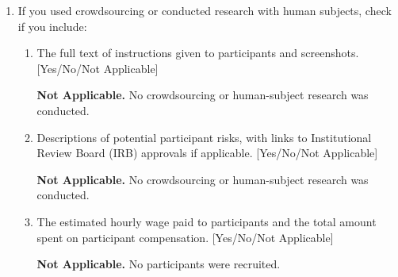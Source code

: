 \begin{enumerate}[leftmargin=*]
\begin{enumerate}
  \textbf{Not Applicable.} No assets are used or released.

  \item New assets either in the supplemental material or as a URL, if applicable. [Yes/No/Not Applicable]

  \textbf{Not Applicable.} No assets are released.

  \item Information about consent from data providers/curators. [Yes/No/Not Applicable]

  \textbf{Not Applicable.} No data are used.

  \item Discussion of sensible content if applicable, e.g., personally identifiable information or offensive content. [Yes/No/Not Applicable]

  \textbf{Not Applicable.} No data or human-generated content are used.
  \end{enumerate}

\item If you used crowdsourcing or conducted research with human subjects, check if you include:
  \begin{enumerate}
  \item The full text of instructions given to participants and screenshots. [Yes/No/Not Applicable]

  \textbf{Not Applicable.} No crowdsourcing or human-subject research was conducted.

  \item Descriptions of potential participant risks, with links to Institutional Review Board (IRB) approvals if applicable. [Yes/No/Not Applicable]

  \textbf{Not Applicable.} No crowdsourcing or human-subject research was conducted.

  \item The estimated hourly wage paid to participants and the total amount spent on participant compensation. [Yes/No/Not Applicable]

  \textbf{Not Applicable.} No participants were recruited.
  \end{enumerate}

\end{enumerate}
\endgroup
